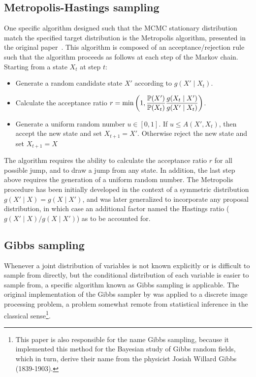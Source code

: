 \subsection{Metropolis-Hastings sampling}
\label{subsec:metropolis-hastings-sampling}

One specific algorithm designed such that the \acrshort{MCMC} stationary distribution match the specified target distribution is the Metropolis algorithm, presented in the original paper~\citep{Metropolis1953}.
This algorithm is composed of an acceptance/rejection rule such that the algorithm proceeds as follows at each step of the \gls{Markov chain}.
Starting from a state $X_t$ at step $t$:
\begin{itemize}
    \item Generate a random candidate state $X'$ according to $g(X'\mid X_t)$.
    \item Calculate the acceptance ratio $\displaystyle r=\min \left(1,{\frac {\mathbb{P} (X')}{\mathbb{P} (X_{t})}}{\frac {g(X_{t}\mid X')}{g(X'\mid X_{t})}}\right)$.
    \item Generate a uniform random number $u\in [0,1]$.
    If $u\leq A(X',X_{t})$, then accept the new state and set $X_{t+1}=X'$.
    Otherwise reject the new state and set $X_{t+1}=X$
\end{itemize}

The algorithm requires the ability to calculate the acceptance ratio $r$ for all possible jump, and to draw a jump from any state.
In addition, the last step above requires the generation of a uniform random number.
The Metropolis procedure has been initially developed in the context of a symmetric distribution $g(X'\mid X) = g(X \mid X')$, and was later generalized to incorporate any proposal distribution, in which case an additional factor named the Hastings ratio ($g(X'\mid X) / g(X \mid X')$) as to be accounted for.

\subsection{Gibbs sampling}
\label{subsec:gibbs-sampling}

Whenever a joint distribution of variables is not known explicitly or is difficult to sample from directly, but the conditional distribution of each variable is easier to sample from, a specific algorithm known as Gibbs sampling is applicable.
The original implementation of the Gibbs sampler by \citet{Geman1984} was applied to a discrete image processing problem, a problem somewhat remote from statistical inference in the classical sense\footnote{This paper is also responsible for the name Gibbs sampling, because it implemented this method for the Bayesian study of Gibbs random fields, which in turn, derive their name from the physicist Josiah Willard Gibbs (1839-1903).}.

